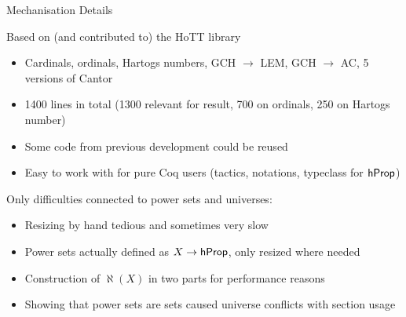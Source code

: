 \documentclass[xcolor=dvipsnames,compress,aspectratio=169,handout]{beamer}
\begin{document}
\begin{frame}{Mechanisation Details}

	\pause
	\vspace{0.25cm}
			Based on (and contributed to) the HoTT library
			\begin{itemize}
				\vspace{0.15cm}
				\item
				Cardinals, ordinals, Hartogs numbers, GCH $\to$ LEM, GCH $\to$ AC, 5 versions of Cantor
				\vspace{0.15cm}
				\item
				1400 lines in total (1300 relevant for result, 700 on ordinals, 250 on Hartogs number)
				\vspace{0.15cm}
				\item
				Some code from previous development could be reused
				\vspace{0.15cm}
				\item
				Easy to work with for pure Coq users (tactics, notations, typeclass for $\mathsf{hProp}$)
			\end{itemize}

	\pause
	\vspace{0.5cm}
	Only difficulties connected to power sets and universes:
	\begin{itemize}
		\vspace{0.15cm}
		\item
		Resizing by hand tedious and sometimes very slow
		\vspace{0.15cm}
		\item
		Power sets actually defined as $X\to\mathsf{hProp}$, only resized where needed
		\vspace{0.15cm}
		\item
		Construction of $\aleph(X)$ in two parts for performance reasons
		\vspace{0.15cm}
		\item
		Showing that power sets are sets caused universe conflicts with section usage
	\end{itemize}
\end{frame}
\end{document}
